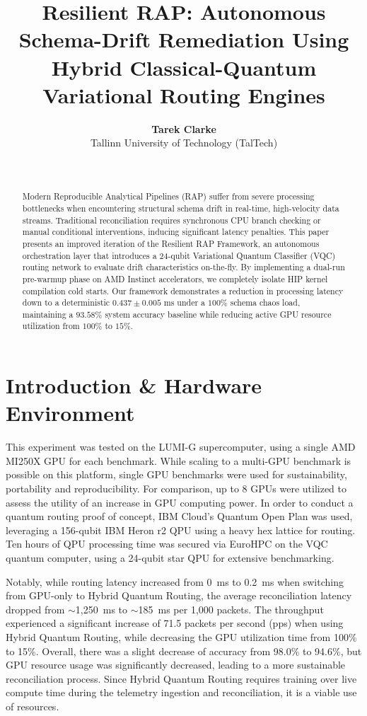 \documentclass[11pt]{article}
\title{\textbf{Resilient RAP: Autonomous Schema-Drift Remediation Using Hybrid Classical-Quantum Variational Routing Engines}}
\author{\textbf{Tarek Clarke} \\ Tallinn University of Technology (TalTech)}
\date{\monthname\ \the\year}
\begin{document}
\maketitle

\begin{abstract}
Modern Reproducible Analytical Pipelines (RAP) suffer from severe processing bottlenecks when encountering structural schema drift in real-time, high-velocity data streams. Traditional reconciliation requires synchronous CPU branch checking or manual conditional interventions, inducing significant latency penalties. This paper presents an improved iteration of the Resilient RAP Framework, an autonomous orchestration layer that introduces a 24-qubit Variational Quantum Classifier (VQC) routing network to evaluate drift characteristics on-the-fly. By implementing a dual-run pre-warmup phase on AMD Instinct accelerators, we completely isolate HIP kernel compilation cold starts. Our framework demonstrates a reduction in processing latency down to a deterministic $0.437\pm0.005\text{ ms}$ under a $100\%$ schema chaos load, maintaining a $93.58\%$ system accuracy baseline while reducing active GPU resource utilization from $100\%$ to $15\%$.
\end{abstract}

\section{Introduction \& Hardware Environment}
This experiment was tested on the LUMI-G supercomputer, using a single AMD MI250X GPU for each benchmark. While scaling to a multi-GPU benchmark is possible on this platform, single GPU benchmarks were used for sustainability, portability and reproducibility. For comparison, up to 8 GPUs were utilized to assess the utility of an increase in GPU computing power. In order to conduct a quantum routing proof of concept, IBM Cloud's Quantum Open Plan was used, leveraging a 156-qubit IBM Heron r2 QPU using a heavy hex lattice for routing. Ten hours of QPU processing time was secured via EuroHPC on the VQC quantum computer, using a 24-qubit star QPU for extensive benchmarking.

Notably, while routing latency increased from 0~ms to 0.2~ms when switching from GPU-only to Hybrid Quantum Routing, the average reconciliation latency dropped from $\sim$1,250~ms to $\sim$185~ms per 1,000 packets. The throughput experienced a significant increase of 71.5 packets per second (pps) when using Hybrid Quantum Routing, while decreasing the GPU utilization time from 100\% to 15\%. Overall, there was a slight decrease of accuracy from 98.0\% to 94.6\%, but GPU resource usage was significantly decreased, leading to a more sustainable reconciliation process. Since Hybrid Quantum Routing requires training over live compute time during the telemetry ingestion and reconciliation, it is a viable use of resources.
\end{document}
